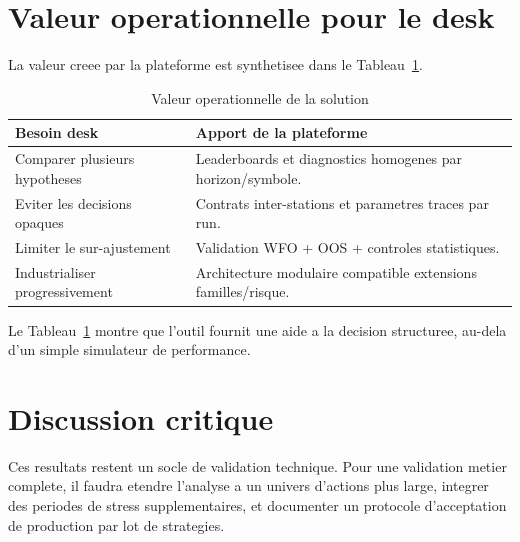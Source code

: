 \section{Valeur operationnelle pour le desk}
La valeur creee par la plateforme est synthetisee dans le
Tableau~\ref{tab:operational-value}.

\begin{table}[H]
\centering
\caption{Valeur operationnelle de la solution}
\label{tab:operational-value}
\begin{tabular}{p{4.5cm}p{8.8cm}}
\toprule
\textbf{Besoin desk} & \textbf{Apport de la plateforme} \\
\midrule
Comparer plusieurs hypotheses & Leaderboards et diagnostics homogenes par horizon/symbole. \\
Eviter les decisions opaques & Contrats inter-stations et parametres traces par run. \\
Limiter le sur-ajustement & Validation WFO + OOS + controles statistiques. \\
Industrialiser progressivement & Architecture modulaire compatible extensions familles/risque. \\
\bottomrule
\end{tabular}
\end{table}

Le Tableau~\ref{tab:operational-value} montre que l'outil fournit une aide a la
decision structuree, au-dela d'un simple simulateur de performance.

\section{Discussion critique}
Ces resultats restent un socle de validation technique. Pour une validation
metier complete, il faudra etendre l'analyse a un univers d'actions plus large,
integrer des periodes de stress supplementaires, et documenter un protocole
d'acceptation de production par lot de strategies.

